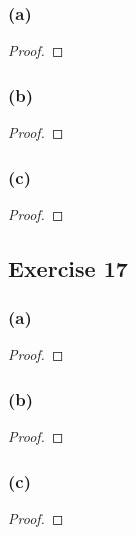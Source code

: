 \documentclass[14pt]{extarticle}
\begin{document}
\subsubsection{(a)}

\begin{proof}

\end{proof}

\subsubsection{(b)}

\begin{proof}

\end{proof}

\subsubsection{(c)}

\begin{proof}

\end{proof}

\subsection{Exercise 17}

\subsubsection{(a)}

\begin{proof}

\end{proof}

\subsubsection{(b)}

\begin{proof}

\end{proof}

\subsubsection{(c)}

\begin{proof}

\end{proof}
\end{document}
